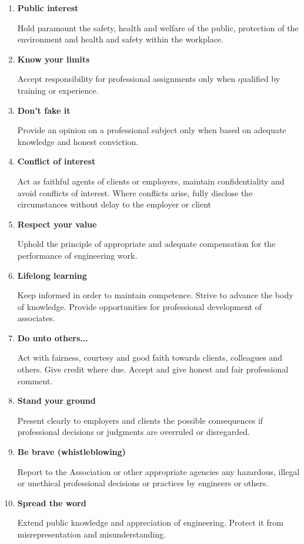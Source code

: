 \documentclass{article}
\begin{document}
\begin{enumerate}
\item \textbf{Public interest}

Hold paramount the safety, health and welfare of the
public, protection of the environment and health and
safety within the workplace. 
\item \textbf{Know your limits}

Accept responsibility for professional assignments only
when qualified by training or experience.
\item \textbf{Don't fake it}

Provide an opinion on a professional subject only when
based on adequate knowledge and honest conviction.

\item \textbf{Conflict of interest
}

Act as faithful agents of clients or employers, maintain
confidentiality and avoid conflicts of interest. Where
conflicts arise, fully disclose the circumstances without
delay to the employer or client

\item \textbf{Respect your value}

Uphold the principle of appropriate and adequate
compensation for the performance of engineering work.

\item \textbf{Lifelong learning}

 Keep informed in order to maintain competence. Strive to advance the body of knowledge. Provide opportunities
for professional development of associates.

\item \textbf{Do unto others...}

Act with fairness, courtesy and good faith towards
clients, colleagues and others. Give credit where due.
Accept and give honest and fair professional comment.

\item \textbf{Stand your ground}

Present clearly to employers and clients the possible
consequences if professional decisions or judgments are
overruled or disregarded.

\item \textbf{Be brave (whistleblowing)}

 Report to the Association or other appropriate agencies
any hazardous, illegal or unethical professional decisions
or practices by engineers or others.

\item \textbf{Spread the word}

 Extend public knowledge and appreciation of
engineering. Protect it from misrepresentation and
misunderstanding.

\end{enumerate}
\end{document}
